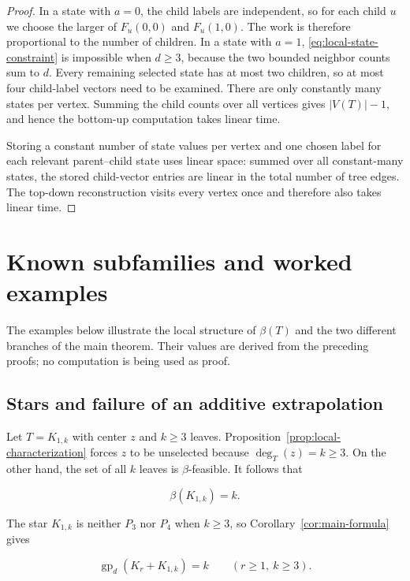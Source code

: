 \documentclass[11pt,a4paper]{article}
\numberwithin{equation}{section}
\begin{document}
\begin{proof}
In a state with \(a=0\), the child labels are
independent, so for each child \(u\) we choose the larger of
\(F_u(0,0)\) and \(F_u(1,0)\). The work is therefore proportional to the
number of children. In a state with \(a=1\), \eqref{eq:local-state-constraint} is impossible when
\(d\ge 3\), because the two bounded neighbor counts sum to \(d\). Every
remaining selected state has at most two children, so at most four
child-label vectors need to be examined. There are only constantly many
states per vertex. Summing the child counts over all vertices gives
\(|V(T)|-1\), and hence the bottom-up computation takes linear time.

Storing a constant number of state values per vertex and one chosen
label for each relevant parent--child state uses linear space: summed
over all constant-many states, the stored child-vector entries are
linear in the total number of tree edges. The
top-down reconstruction visits every vertex once and therefore also
takes linear time.
\end{proof}

\section{Known subfamilies and worked examples}\label{sec:examples}

The examples below illustrate the local structure of \(\beta(T)\) and
the two different branches of the main theorem. Their values are derived
from the preceding proofs; no computation is being used as proof.

\subsection{Stars and failure of an additive extrapolation}\label{sec:stars}

Let \(T=K_{1,k}\) with center \(z\) and \(k\ge 3\) leaves.
Proposition~\ref{prop:local-characterization} forces \(z\) to be
unselected because \(\deg_T(z)=k\ge 3\). On the
other hand, the set of all \(k\) leaves is \(\beta\)-feasible. It
follows that

\[
\beta(K_{1,k})=k.
\]

The star \(K_{1,k}\) is neither \(P_3\) nor \(P_4\) when \(k\ge 3\), so
Corollary~\ref{cor:main-formula} gives

\begin{equation}\label{eq:star-family}
\operatorname{gp}_d(K_r+K_{1,k})=k
\qquad (r\ge 1,\ k\ge 3).
\end{equation}
\end{document}
